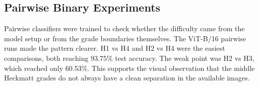 \documentclass[twocolumn,10pt]{article}
\begin{document}
\begin{table}[H]
\centering
\scriptsize
{}
\caption{Selected hyperparameter search results}
\label{tab:hparam_search}
\end{table}

\subsection{Pairwise Binary Experiments}
Pairwise classifiers were trained to check whether the difficulty came from the model setup or from the grade boundaries themselves. The ViT-B/16 pairwise runs made the pattern clearer. H1 vs H4 and H2 vs H4 were the easiest comparisons, both reaching 93.75\% test accuracy. The weak point was H2 vs H3, which reached only 60.53\%. This supports the visual observation that the middle Heckmatt grades do not always have a clean separation in the available images.

\begin{table}[H]
\centering
\scriptsize
{}
\caption{ViT-B/16 pairwise binary classification results}
\label{tab:vit_pairwise}
\end{table}
\end{document}
